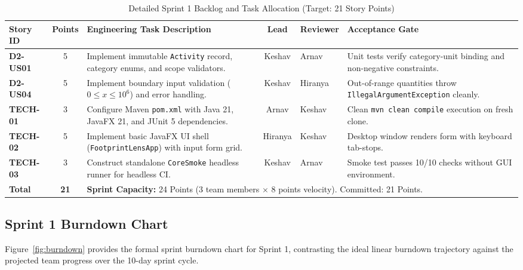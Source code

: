 \documentclass[12pt,a4paper]{article}
\newcommand{\code}[1]{\texttt{#1}}
\begin{document}
\begin{table}[ht]
\centering
\small
\caption{Detailed Sprint 1 Backlog and Task Allocation (Target: 21 Story Points)}
\begin{tabularx}{\textwidth}{@{}p{1.4cm}cp{5.2cm}cp{1.8cm}X@{}}
\toprule
\textbf{Story ID} & \textbf{Points} & \textbf{Engineering Task Description} & \textbf{Lead} & \textbf{Reviewer} & \textbf{Acceptance Gate}\\
\midrule
\textbf{D2-US01} & 5 & Implement immutable \code{Activity} record, category enums, and scope validators. & Keshav & Arnav & Unit tests verify category-unit binding and non-negative constraints.\\
\textbf{D2-US04} & 5 & Implement boundary input validation ($0 \le x \le 10^6$) and error handling. & Keshav & Hiranya & Out-of-range quantities throw \code{IllegalArgumentException} cleanly.\\
\textbf{TECH-01} & 3 & Configure Maven \code{pom.xml} with Java 21, JavaFX 21, and JUnit 5 dependencies. & Arnav & Keshav & Clean \code{mvn clean compile} execution on fresh clone.\\
\textbf{TECH-02} & 5 & Implement basic JavaFX UI shell (\code{FootprintLensApp}) with input form grid. & Hiranya & Keshav & Desktop window renders form with keyboard tab-stops.\\
\textbf{TECH-03} & 3 & Construct standalone \code{CoreSmoke} headless runner for headless CI. & Keshav & Arnav & Smoke test passes 10/10 checks without GUI environment.\\
\midrule
\textbf{Total} & \textbf{21} & \multicolumn{4}{l}{\textbf{Sprint Capacity:} 24 Points (3 team members $\times$ 8 points velocity). Committed: 21 Points.}\\
\bottomrule
\end{tabularx}
\end{table}

\subsection{Sprint 1 Burndown Chart}
Figure~\ref{fig:burndown} provides the formal sprint burndown chart for Sprint 1, contrasting the ideal linear burndown trajectory against the projected team progress over the 10-day sprint cycle.
\end{document}
